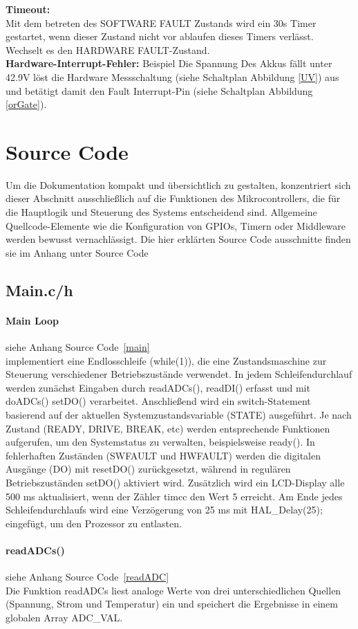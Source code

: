 \documentclass[paper=a4,11pt]{scrreprt}
\begin{document}
\textbf{Timeout:}\\
Mit dem betreten des SOFTWARE FAULT Zustands wird ein 30s Timer gestartet, wenn dieser Zustand nicht vor ablaufen dieses Timers verlässt. Wechselt es den HARDWARE FAULT-Zustand.\\
\textbf{Hardware-Interrupt-Fehler:}
Beispiel Die Spannung Des Akkus fällt unter 42.9V löst die Hardware Messschaltung (siehe Schaltplan Abbildung \ref{UV}) aus und betätigt damit den Fault Interrupt-Pin (siehe Schaltplan Abbildung \ref{orGate}). 

\section{Source Code}
Um die Dokumentation kompakt und übersichtlich zu gestalten, konzentriert sich dieser Abschnitt ausschließlich auf die Funktionen des Mikrocontrollers, die für die Hauptlogik und Steuerung des Systems entscheidend sind. Allgemeine Quellcode-Elemente wie die Konfiguration von GPIOs, Timern oder Middleware werden bewusst vernachlässigt. Die hier erklärten Source Code ausschnitte finden sie im Anhang unter Source Code
\subsection{Main.c/h}
\paragraph{\textbf{Main Loop}} siehe Anhang Source Code~\ref{main}\\
implementiert eine Endlosschleife (while(1)), die eine Zustandsmaschine zur Steuerung verschiedener Betriebszustände verwendet. In jedem Schleifendurchlauf werden zunächst Eingaben durch readADCs(), readDI() erfasst und mit doADCs() setDO() verarbeitet. Anschließend wird ein switch-Statement basierend auf der aktuellen Systemzustandsvariable (STATE) ausgeführt. Je nach Zustand (READY, DRIVE, BREAK, etc) werden entsprechende Funktionen aufgerufen, um den Systemstatus zu verwalten, beispielsweise ready(). In fehlerhaften Zuständen (SWFAULT und HWFAULT) werden die digitalen Ausgänge (DO) mit resetDO() zurückgesetzt, während in regulären Betriebszuständen setDO() aktiviert wird. Zusätzlich wird ein LCD-Display alle 500 ms aktualisiert, wenn der Zähler timcc den Wert 5 erreicht. Am Ende jedes Schleifendurchlaufs wird eine Verzögerung von 25 ms mit HAL\_Delay(25); eingefügt, um den Prozessor zu entlasten.
\paragraph{\textbf{readADCs()}} siehe Anhang Source Code~\ref{readADC}\\
Die Funktion readADCs liest analoge Werte von drei unterschiedlichen Quellen (Spannung, Strom und Temperatur) ein und speichert die Ergebnisse in einem globalen Array ADC\_VAL.
\end{document}
